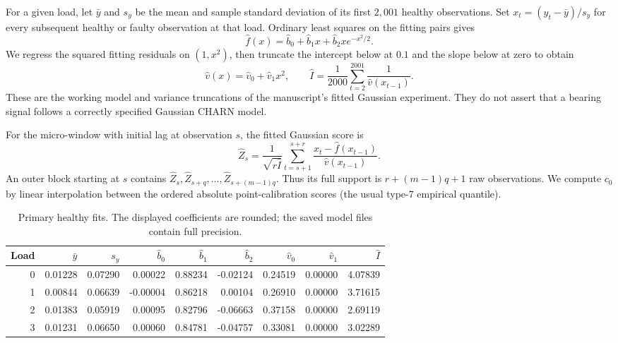 \documentclass[11pt]{article}
\theoremstyle{definition}
\theoremstyle{remark}
\newcommand{\1}{\mathbf 1}
\begin{document}
For a given load, let \(\bar y\) and \(s_y\) be the mean and sample standard deviation of its first \(2{,}001\) healthy observations. Set \(x_t=(y_t-\bar y)/s_y\) for every subsequent healthy or faulty observation at that load. Ordinary least squares on the fitting pairs gives
\[
 \widehat f(x)=\widehat b_0+\widehat b_1x+
                 \widehat b_2xe^{-x^2/2}.
\]
We regress the squared fitting residuals on \((1,x^2)\), then truncate the intercept below at \(0.1\) and the slope below at zero to obtain
\[
 \widehat v(x)=\widehat v_0+\widehat v_1x^2,\qquad
 \widehat I=\frac1{2000}\sum_{t=2}^{2001}\frac1{\widehat v(x_{t-1})}.
\]
These are the working model and variance truncations of the manuscript's fitted Gaussian experiment. They do not assert that a bearing signal follows a correctly specified Gaussian CHARN model.

For the micro-window with initial lag at observation \(s\), the fitted Gaussian score is
\begin{equation}
 \widehat Z_s
 =\frac1{\sqrt{r\widehat I}}\sum_{t=s+1}^{s+r}
       \frac{x_t-\widehat f(x_{t-1})}{\widehat v(x_{t-1})}.
 \label{eq:cwru_score}
\end{equation}
An outer block starting at \(s\) contains \(\widehat Z_s,\widehat Z_{s+q},\ldots,\widehat Z_{s+(m-1)q}\). Thus its full support is \(r+(m-1)q+1\) raw observations. We compute \(c_0\) by linear interpolation between the ordered absolute point-calibration scores (the usual type-7 empirical quantile).

\begin{table}[H]
\centering\scriptsize
\setlength{\tabcolsep}{4pt}
\begin{tabular}{rrrrrrrrr}
\toprule
Load & $\bar y$ & $s_y$ & $\widehat b_0$ & $\widehat b_1$ & $\widehat b_2$ & $\widehat v_0$ & $\widehat v_1$ & $\widehat I$ \\
\midrule
0 & 0.01228 & 0.07290 & 0.00022 & 0.88234 & -0.02124 & 0.24519 & 0.00000 & 4.07839 \\
1 & 0.00844 & 0.06639 & -0.00004 & 0.86218 & 0.00104 & 0.26910 & 0.00000 & 3.71615 \\
2 & 0.01383 & 0.05919 & 0.00095 & 0.82796 & -0.06663 & 0.37158 & 0.00000 & 2.69119 \\
3 & 0.01231 & 0.06650 & 0.00060 & 0.84781 & -0.04757 & 0.33081 & 0.00000 & 3.02289 \\
\bottomrule
\end{tabular}
\caption{Primary healthy fits. The displayed coefficients are rounded; the saved model files contain full precision.}
\end{table}
\end{document}
